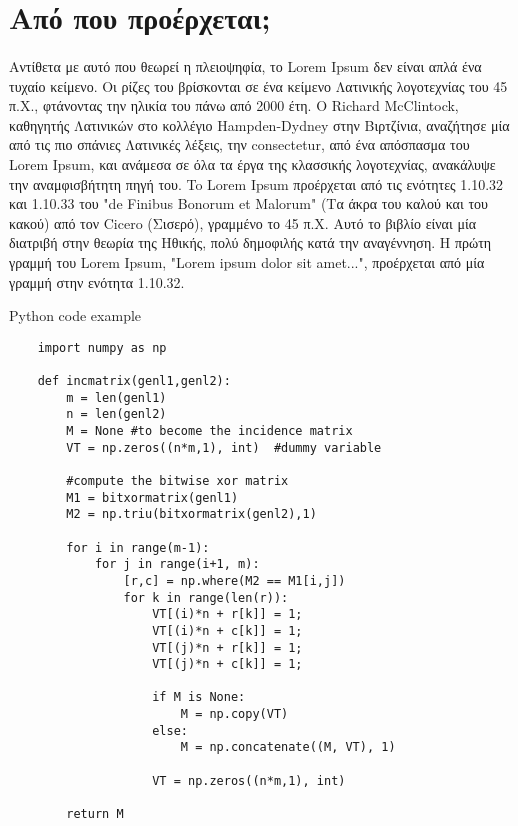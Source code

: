 \section{Από που προέρχεται;}
    \paragraph{}
    Αντίθετα με αυτό που θεωρεί η πλειοψηφία, το Lorem Ipsum δεν είναι απλά ένα τυχαίο κείμενο. Οι ρίζες του
    βρίσκονται σε ένα κείμενο Λατινικής λογοτεχνίας του 45 π.Χ., φτάνοντας την ηλικία του πάνω από 2000 έτη.
    Ο Richard McClintock, καθηγητής Λατινικών στο κολλέγιο Hampden-Dydney στην Βιρτζίνια, αναζήτησε μία από
    τις πιο σπάνιες Λατινικές λέξεις, την consectetur, από ένα απόσπασμα του Lorem Ipsum, και ανάμεσα σε όλα
    τα έργα της κλασσικής λογοτεχνίας, ανακάλυψε την αναμφισβήτητη πηγή του. To Lorem Ipsum προέρχεται από
    τις ενότητες 1.10.32 και 1.10.33 του "de Finibus Bonorum et Malorum" (Τα άκρα του καλού και του κακού) από
    τον Cicero (Σισερό), γραμμένο το 45 π.Χ. Αυτό το βιβλίο είναι μία διατριβή στην θεωρία της Ηθικής, πολύ
    δημοφιλής κατά την αναγέννηση. Η πρώτη γραμμή του Lorem Ipsum, "Lorem ipsum dolor sit amet...", προέρχεται
    από μία γραμμή στην ενότητα 1.10.32.

    \begin{listing}[ht]
    \caption{Python code example}
    \label{listing:python example}

    \begin{verbatim}
    import numpy as np
        
    def incmatrix(genl1,genl2):
        m = len(genl1)
        n = len(genl2)
        M = None #to become the incidence matrix
        VT = np.zeros((n*m,1), int)  #dummy variable
        
        #compute the bitwise xor matrix
        M1 = bitxormatrix(genl1)
        M2 = np.triu(bitxormatrix(genl2),1) 
        
        for i in range(m-1):
            for j in range(i+1, m):
                [r,c] = np.where(M2 == M1[i,j])
                for k in range(len(r)):
                    VT[(i)*n + r[k]] = 1;
                    VT[(i)*n + c[k]] = 1;
                    VT[(j)*n + r[k]] = 1;
                    VT[(j)*n + c[k]] = 1;
        
                    if M is None:
                        M = np.copy(VT)
                    else:
                        M = np.concatenate((M, VT), 1)
        
                    VT = np.zeros((n*m,1), int)
        
        return M
    \end{verbatim}
    \end{listing}

\newpage
